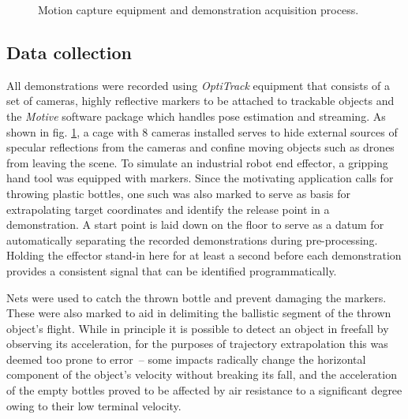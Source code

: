 \documentclass{article}
\begin{document}
\begin{figure}
	\centering
	\caption{Motion capture equipment and demonstration acquisition process. }
	\label{fig:fig1}
\end{figure}

\subsection{Data collection}
\label{sec:collection}


All demonstrations were recorded using \emph{OptiTrack} equipment that consists of a set of cameras, highly reflective markers to be attached to trackable objects and the \emph{Motive} software package which handles pose estimation and streaming. As shown in fig. \ref{fig:fig1}, a cage with 8 cameras installed serves to hide external sources of specular reflections from the cameras and confine moving objects such as drones from leaving the scene. To simulate an industrial robot end effector, a gripping hand tool was equipped with markers. Since the motivating application calls for throwing plastic bottles, one such was also marked to serve as basis for extrapolating target coordinates and identify the release point in a demonstration. A start point is laid down on the floor to serve as a datum for automatically separating the recorded demonstrations during pre-processing. Holding the effector stand-in here for at least a second before each demonstration provides a consistent signal that can be identified programmatically.

Nets were used to catch the thrown bottle and prevent damaging the markers. These were also marked to aid in delimiting the ballistic segment of the thrown object's flight. While in principle it is possible to detect an object in freefall by observing its acceleration, for the purposes of trajectory extrapolation this was deemed too prone to error~-- some impacts radically change the horizontal component of the object's velocity without breaking its fall, and the acceleration of the empty bottles proved to be affected by air resistance to a significant degree owing to their low terminal velocity.
\end{document}
